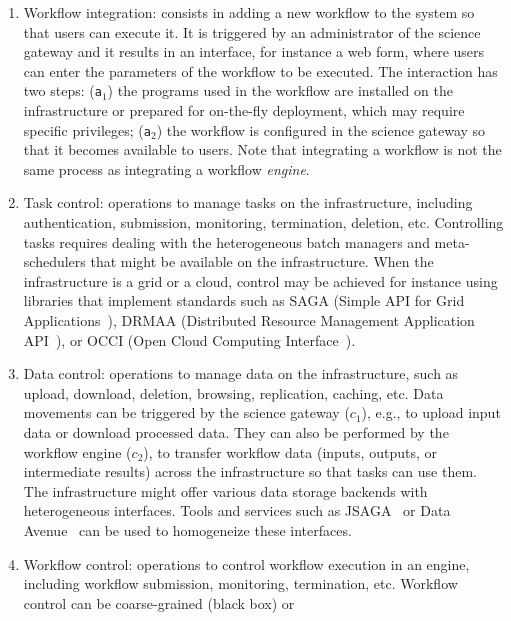 \documentclass[preprint,3p,twocolumn]{elsarticle}
\newcommand{\correction}[1]{\color{blue}#1\color{black}\xspace}
\begin{document}
\begin{enumerate}[leftmargin=0cm,itemindent=0.65cm,label=\texttt{(\alph*)}]

\item Workflow integration: consists in adding a new workflow to the
  system so that users can execute it. It is triggered by an
  administrator of the science gateway and it results in an interface,
  for instance a web form, where users can enter the parameters of the
  workflow to be executed. The interaction has two steps:
  (\texttt{a$_1$}) the programs used in the workflow are installed on
  the infrastructure or prepared for on-the-fly deployment, which
  may require specific privileges; (\texttt{a$_2$}) the
  workflow is configured in the science gateway so that it becomes
  available to users. Note that integrating a workflow is not the same
  process as integrating a workflow \emph{engine}.
\item Task control: operations to manage tasks on the infrastructure,
  including authentication, submission, monitoring, termination,
  deletion, etc. Controlling tasks requires dealing with the
  heterogeneous batch managers and meta-schedulers that might be
  available on the infrastructure. When the infrastructure is a grid
  or a cloud, control may be achieved for instance using libraries that
  implement standards such as SAGA (Simple API for Grid
  Applications~\cite{goodale2006saga}), DRMAA (Distributed Resource
  Management Application API~\cite{troger2012distributed}), or OCCI
  (Open Cloud Computing Interface~\cite{edmonds2012toward}).
\item Data control: operations to manage data on the infrastructure,
  such as upload, download, deletion, browsing, replication, caching,
  etc. Data movements can be triggered \correction{by} the science
  gateway (\texttt{$c_1$}), \correction{e.g.,} to upload input data or
  download processed data. They can also be performed by the workflow
  engine (\texttt{$c_2$}), to transfer workflow data (inputs, outputs,
  or intermediate results) across the infrastructure so that tasks can
  use them. The infrastructure might offer various data storage
  backends with heterogeneous interfaces.  Tools and services such as
  JSAGA~\cite{reynaud2010uniform} or Data Avenue~\cite{hajnal2014data}
  can be used to homogeneize these interfaces.
\item Workflow control: operations to control workflow execution in an
  engine, including workflow submission, monitoring, termination,
  etc. Workflow control can be coarse-grained (black box) or

\end{enumerate}
\end{document}
